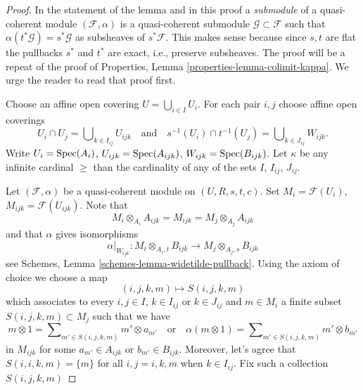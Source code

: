 \begin{proof}
In the statement of the lemma and in this proof
a {\it submodule} of a quasi-coherent module $(\mathcal{F}, \alpha)$
is a quasi-coherent submodule $\mathcal{G} \subset \mathcal{F}$
such that $\alpha(t^*\mathcal{G}) = s^*\mathcal{G}$ as subsheaves of
$s^*\mathcal{F}$. This makes sense because since $s, t$ are flat the
pullbacks $s^*$ and $t^*$ are exact, i.e., preserve subsheaves.
The proof will be a repeat of the proof of
Properties, Lemma \ref{properties-lemma-colimit-kappa}.
We urge the reader to read that proof first.

\medskip\noindent
Choose an affine open covering $U = \bigcup_{i \in I} U_i$.
For each pair $i, j$ choose affine open coverings
$$
U_i \cap U_j = \bigcup\nolimits_{k \in I_{ij}} U_{ijk}
\quad\text{and}\quad
s^{-1}(U_i) \cap t^{-1}(U_j) = \bigcup\nolimits_{k \in J_{ij}} W_{ijk}.
$$
Write $U_i = \mathop{\mathrm{Spec}}(A_i)$, $U_{ijk} = \mathop{\mathrm{Spec}}(A_{ijk})$,
$W_{ijk} = \mathop{\mathrm{Spec}}(B_{ijk})$.
Let $\kappa$ be any infinite cardinal $\geq$ than the cardinality
of any of the sets $I$, $I_{ij}$, $J_{ij}$.

\medskip\noindent
Let $(\mathcal{F}, \alpha)$ be a quasi-coherent module on $(U, R, s, t, c)$.
Set $M_i = \mathcal{F}(U_i)$, $M_{ijk} = \mathcal{F}(U_{ijk})$.
Note that
$$
M_i \otimes_{A_i} A_{ijk} = M_{ijk} = M_j \otimes_{A_j} A_{ijk}
$$
and that $\alpha$ gives isomorphisms
$$
\alpha|_{W_{ijk}} :
M_i \otimes_{A_i, t} B_{ijk}
\longrightarrow
M_j \otimes_{A_j, s} B_{ijk}
$$
see
Schemes, Lemma \ref{schemes-lemma-widetilde-pullback}.
Using the axiom of choice we choose a map
$$
(i, j, k, m) \mapsto S(i, j, k, m)
$$
which associates to every $i, j \in I$, $k \in I_{ij}$ or $k \in J_{ij}$
and $m \in M_i$ a finite subset $S(i, j, k, m) \subset M_j$
such that we have
$$
m \otimes 1 = \sum\nolimits_{m' \in S(i, j, k, m)} m' \otimes a_{m'}
\quad\text{or}\quad
\alpha(m \otimes 1) = \sum\nolimits_{m' \in S(i, j, k, m)} m' \otimes b_{m'}
$$
in $M_{ijk}$ for some $a_{m'} \in A_{ijk}$ or $b_{m'} \in B_{ijk}$.
Moreover, let's agree that $S(i, i, k, m) = \{m\}$ for all
$i, j = i, k, m$ when $k \in I_{ij}$. Fix such a collection $S(i, j, k, m)$


\end{proof}
